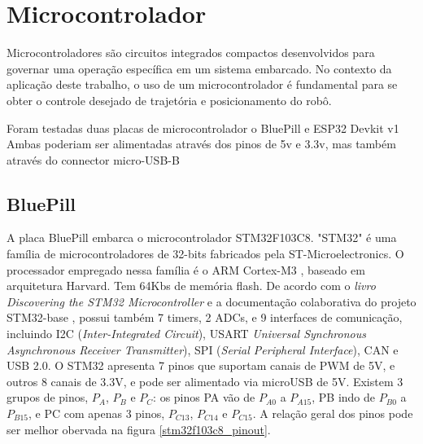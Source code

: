 
\section{Microcontrolador}

Microcontroladores são circuitos integrados compactos desenvolvidos para governar
uma operação específica em um sistema embarcado. No contexto da aplicação deste
trabalho, o uso de um microcontrolador é fundamental para se obter o controle
desejado de trajetória e posicionamento do robô.

Foram testadas duas placas de microcontrolador o BluePill e ESP32 Devkit v1
Ambas poderiam ser alimentadas através dos pinos de 5v e 3.3v, mas também através do connector micro-USB-B

\subsection{BluePill}

A placa BluePill embarca o microcontrolador STM32F103C8.
"STM32" é uma família de microcontroladores de 32-bits fabricados pela
ST-Microelectronics. O processador empregado nessa família é o ARM Cortex-M3 \cite{cortex_m3},
baseado em arquitetura Harvard. Tem 64Kbs de memória flash.  De acordo com o \textit{livro Discovering the STM32 Microcontroller} \cite{stm_doc} e 
a documentação colaborativa \cite{stm32_base_org} do projeto STM32-base \cite{stm32_base},
possui também 7 timers, 2 ADCs, e 9 interfaces de comunicação, incluindo I2C (\textit{Inter-Integrated Circuit}), USART 
\textit{Universal Synchronous Asynchronous Receiver Transmitter}), SPI (\textit{Serial Peripheral Interface}), CAN e
USB 2.0. O STM32 apresenta 7 pinos que suportam canais de PWM de 5V, e outros 8 canais de 3.3V, e pode ser alimentado
via microUSB de 5V. Existem 3 grupos de pinos,  $P_{A}$,  $P_{B}$ e  $P_{C}$: os pinos PA vão de $P_{A0}$ 
a $P_{A15}$, PB indo de $P_{B0}$ a $P_{B15}$, e PC com apenas 3 pinos, $P_{C13}$, $P_{C14}$ e $P_{C15}$.
A relação geral dos pinos pode ser melhor obervada na figura \ref{stm32f103c8_pinout}.

